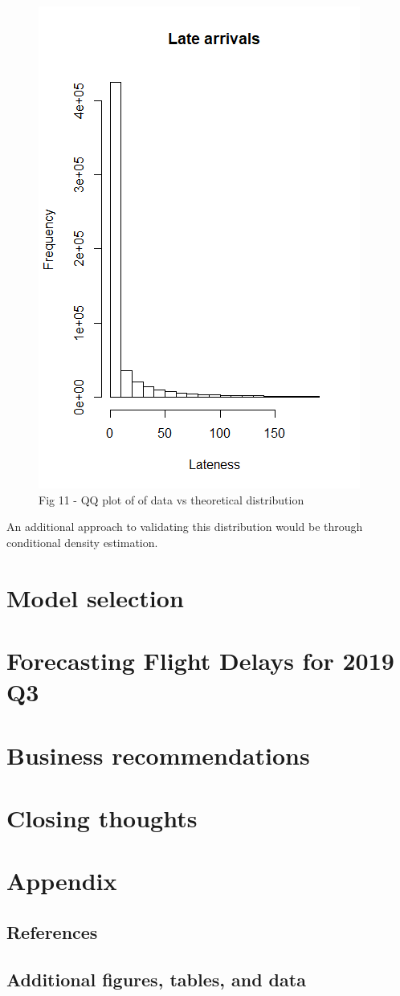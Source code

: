 \documentclass[12pt, a4paper]{book}
\newcommand\tab[1][1cm]{\hspace*{#1}}
\begin{document}
			\begin{figure}
			\centering
	 		\includegraphics[width = .45 \textwidth]{../figures/LateArrivalsHistogram}
	 		\caption{Fig 11  - QQ plot of of data vs theoretical distribution}
	 		\end{figure}
	\tab An additional approach to validating this distribution would be through conditional density estimation.
\chapter{Model selection}
\chapter{Forecasting Flight Delays for 2019 Q3}
\chapter{Business recommendations}
\chapter{Closing thoughts}
\chapter{Appendix}
	\section{References}
	\section{Additional figures, tables, and data}
\pagebreak


\nocite{*}

\end{document}
